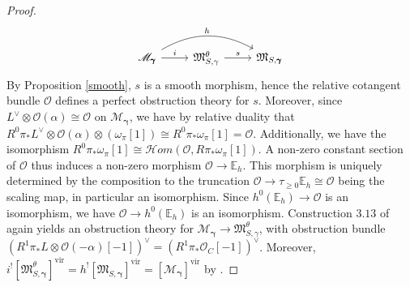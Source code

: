 \documentclass[12pt, oneside]{amsart}   	%
\newcommand{\vir}{\operatorname{vir}}
\numberwithin{equation}{section}
\numberwithin{thm}{section}
\numberwithin{figure}{section}
\begin{document}
\begin{proof}
\begin{equation}\label{triple2}
\begin{tikzcd}
\mathscr{M}_{\pmb\gamma} \arrow[r,"i"] \arrow[bend left,"h"]{rr} &  \mathfrak{M}_{S,\gamma}^\theta \arrow[r,"s"] &  \mathfrak{M}_{S,\pmb\gamma}
\end{tikzcd}
\end{equation}
By Proposition \ref{smooth}, $s$ is a smooth morphism, hence the relative cotangent bundle $\mathcal{O}$ defines a perfect obstruction theory for $s$. Moreover, since $L^{\vee} \otimes \mathcal{O}(\alpha) \cong \mathcal{O}$ on $\mathscr{M}_{\pmb\gamma}$, we have by relative duality that $R^0\pi_*L^{\vee}\otimes \mathcal{O}(\alpha) \otimes (\omega_{\pi}[1]) \cong R^0\pi_*\omega_{\pi}[1] = \mathcal{O}$. Additionally, we have the isomorphism $R^0\pi_*\omega_{\pi}[1] \cong \mathscr{H}om(\mathcal{O},R\pi_*\omega_{\pi}[1])$. A non-zero constant section of $\mathcal{O}$ thus induces a non-zero morphism $\mathcal{O} \rightarrow \mathbb{E}_h$. This morphism is uniquely determined by the composition to the truncation $\mathcal{O} \rightarrow \tau_{\ge 0} \mathbb{E}_h \cong \mathcal{O}$ being the scaling map, in particular an isomorphism. Since $h^0(\mathbb{E}_h) \rightarrow \mathcal{O}$ is an isomorphism, we have $\mathcal{O} \rightarrow h^0(\mathbb{E}_h)$ is an isomorphism. Construction $3.13$ of \cite{vpull} again yields an obstruction theory for $\mathscr{M}_{\pmb\gamma} \rightarrow \mathfrak{M}_{S,\gamma}^{\theta}$, with obstruction bundle $(R^1\pi_*L \otimes \mathcal{O}(-\alpha)[-1] )^{\vee}= (R^1\pi_*\mathcal{O}_{C}[-1])^{\vee}$. Moreover, $i^![\mathfrak{M}^{\theta}_{S,\pmb\gamma}]^{\vir} = h^![\mathfrak{M}_{S,\pmb\gamma}]^{\vir} = [\mathscr{M}_{\pmb\gamma}]^{\vir}$ by \cite[Corollary $4.9$]{vpull}.






\end{proof}
\end{document}
